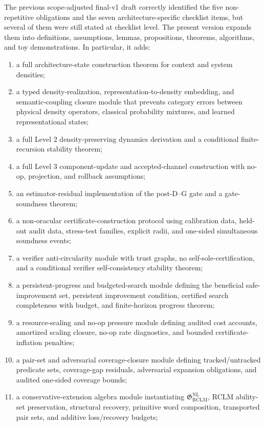 \documentclass[11pt,a4paper]{article}
\newcommand{\RCLM}{\mathrm{RCLM}}
\newcommand{\NL}{\mathrm{NL}}
\begin{document}
The previous scope-adjusted final-v1 draft correctly identified the five non-repetitive obligations and the seven architecture-specific checklist items, but several of them were still stated at checklist level.  The present version expands them into definitions, assumptions, lemmas, propositions, theorems, algorithms, and toy demonstrations.  In particular, it adds:
\begin{enumerate}[label=(\arabic*),leftmargin=1.5em]
    \item a full architecture-state construction theorem for context and system densities;
    \item a typed density-realization, representation-to-density embedding, and semantic-coupling closure module that prevents category errors between physical density operators, classical probability mixtures, and learned representational states;
    \item a full Level 2 density-preserving dynamics derivation and a conditional finite-recursion stability theorem;
    \item a full Level 3 component-update and accepted-channel construction with no-op, projection, and rollback assumptions;
    \item an estimator-residual implementation of the post-D--G gate and a gate-soundness theorem;
    \item a non-oracular certificate-construction protocol using calibration data, held-out audit data, stress-test families, explicit radii, and one-sided simultaneous soundness events;
    \item a verifier anti-circularity module with trust graphs, no self-sole-certification, and a conditional verifier self-consistency stability theorem;
    \item a persistent-progress and budgeted-search module defining the beneficial safe-improvement set, persistent improvement condition, certified search completeness with budget, and finite-horizon progress theorem;
    \item a resource-scaling and no-op pressure module defining audited cost accounts, amortized scaling closure, no-op rate diagnostics, and bounded certificate-inflation penalties;
    \item a pair-set and adversarial coverage-closure module defining tracked/untracked predicate sets, coverage-gap residuals, adversarial expansion obligations, and audited one-sided coverage bounds;
    \item a conservative-extension algebra module instantiating \(\mathfrak G_{\RCLM}^{\NL}\), RCLM ability-set preservation, structural recovery, primitive word composition, transported pair sets, and additive loss/recovery budgets;

\end{enumerate}
\end{document}
